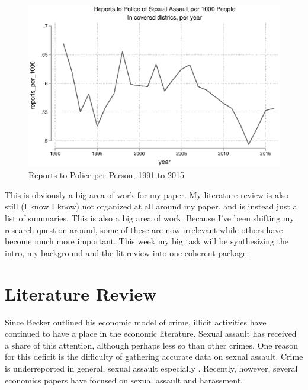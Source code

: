 \documentclass[AER,draftmode]{AEA}
\begin{document}
\begin{figure}

\includegraphics[width=\linewidth]{figures/police_yearly_reports.eps}

\caption{Reports to Police per Person, 1991 to 2015} \label{figure:police_yearly}
\end{figure}


This is obviously a big area of work for my paper. My literature review is also still (I know I know) not organized at all around my paper, and is instead just a list of summaries. This is also a big area of work. Because I've been shifting my research question around, some of these are now irrelevant while others have become much more important. This week my big task will be synthesizing the intro, my background and the lit review into one coherent package.

\section{Literature Review}
Since Becker outlined his economic model of crime, illicit activities have continued to have a place in the economic literature. Sexual assault has received a share of this attention, although perhaps less so than other crimes. One reason for this deficit is the difficulty of gathering accurate data on sexual assault. Crime is underreported in general, sexual assault especially \cite{kilpatrick_drug-facilitated_2007} \cite{fisher_sexual_2000}. Recently, however, several economics papers have focused on sexual assault and harassment. 
\end{document}
